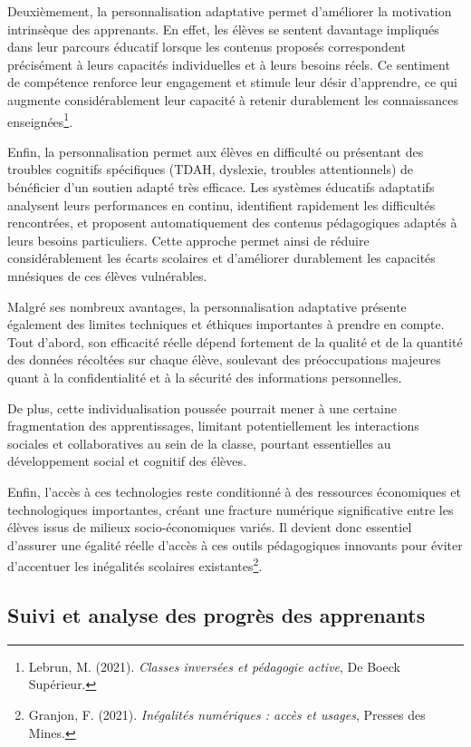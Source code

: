 \documentclass[11pt,a4paper]{report}
\begin{document}
Deuxièmement, la personnalisation adaptative permet d’améliorer la motivation intrinsèque des apprenants. En effet, les élèves se sentent davantage impliqués dans leur parcours éducatif lorsque les contenus proposés correspondent précisément à leurs capacités individuelles et à leurs besoins réels. Ce sentiment de compétence renforce leur engagement et stimule leur désir d’apprendre, ce qui augmente considérablement leur capacité à retenir durablement les connaissances enseignées\footnote{Lebrun, M. (2021). \textit{Classes inversées et pédagogie active}, De Boeck Supérieur.}.

Enfin, la personnalisation permet aux élèves en difficulté ou présentant des troubles cognitifs spécifiques (TDAH, dyslexie, troubles attentionnels) de bénéficier d’un soutien adapté très efficace. Les systèmes éducatifs adaptatifs analysent leurs performances en continu, identifient rapidement les difficultés rencontrées, et proposent automatiquement des contenus pédagogiques adaptés à leurs besoins particuliers. Cette approche permet ainsi de réduire considérablement les écarts scolaires et d’améliorer durablement les capacités mnésiques de ces élèves vulnérables.

Malgré ses nombreux avantages, la personnalisation adaptative présente également des limites techniques et éthiques importantes à prendre en compte. Tout d’abord, son efficacité réelle dépend fortement de la qualité et de la quantité des données récoltées sur chaque élève, soulevant des préoccupations majeures quant à la confidentialité et à la sécurité des informations personnelles.

De plus, cette individualisation poussée pourrait mener à une certaine fragmentation des apprentissages, limitant potentiellement les interactions sociales et collaboratives au sein de la classe, pourtant essentielles au développement social et cognitif des élèves.

Enfin, l’accès à ces technologies reste conditionné à des ressources économiques et technologiques importantes, créant une fracture numérique significative entre les élèves issus de milieux socio-économiques variés. Il devient donc essentiel d’assurer une égalité réelle d’accès à ces outils pédagogiques innovants pour éviter d’accentuer les inégalités scolaires existantes\footnote{Granjon, F. (2021). \textit{Inégalités numériques : accès et usages}, Presses des Mines.}.

\subsection{Suivi et analyse des progrès des apprenants}
\end{document}
